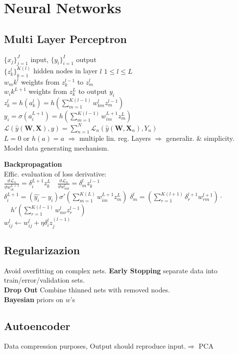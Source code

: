 \section*{Neural Networks}
\subsection*{Multi Layer Perceptron}
$\{x_j\}_{j=1}^J$ input, $\{y_i\}_{i=1}^I$ output\\
$\{z_k^l\}_{k=1}^{K(l)}$ hidden nodes in layer $l$ $1{\leq}l{\leq}L$\\
$w_mk^l$ weights from $z_k^{l-1}$ to $z_m^l$\\
$w_ik^{L+1}$ weights from $z_k^L$ to output $y_i$\\
$z_k^l=h(a_k^l)=h(\sum_{m=1}^{K(l-1)}w_{km}^lz_m^{l-1})$\\
$y_i=\sigma(a_i^{L+1})=h(\sum_{m=1}^{K(l-1)}w_{im}^{L+1}z_m^{L})$\\
$\mathcal{L}(\hat{y}(\mathbf{W}, \mathbf{X}), y){=}\sum_{n=1}^N\mathcal{L}_n(\hat{y}(\mathbf{W},\mathbf{X}_n),Y_n)$\\
$L=0$ or $h(a)=a$ $\Rightarrow$ multiple lin. reg.
Layers $\Rightarrow$ generaliz. \& simplicity.\\
Model data generating mechanism.

\textbf{Backpropagation}\\
Effic. evaluation of loss derivative:\\
$\frac{\vartheta\mathcal{L}_n}{\vartheta w_{ik}^{L+1}}{=}\delta_i^{L+1}z_k^L \quad \frac{\vartheta\mathcal{L}_n}{\vartheta w_{mk}^{l}}{=}\delta_m^{l}z_k^{l-1}$\\
$\delta_i^{L+1}{=}(\hat{y_i}{-}y_i)\sigma'(\sum_{m=1}^{K(L)}w_{im}^{L+1}z_m^L)$
$\delta_m^{l}{=}(\sum_{r=1}^{K(l+1)}\delta_r^{l+1}w_{rm}^{l+1})\cdot$\\$\quad h'(\sum_{r=1}^{K(l-1)}w_{mr}^lz_r^{l-1})$\\
$w_{ij}^{l}\leftarrow w_{ij}^{l}+\eta\delta_i^lz_j^{(l-1)}$
\subsection*{Regularizazion}
Avoid overfitting on complex nets.
\textbf{Early Stopping} separate data into train/error/validation sets.\\
\textbf{Drop Out} Combine thinned nets with removed nodes.\\
\textbf{Bayesian} priors on $w$'s

\subsection*{Autoencoder}
Data compression purposes, Output should reproduce input.$\Rightarrow$ PCA

